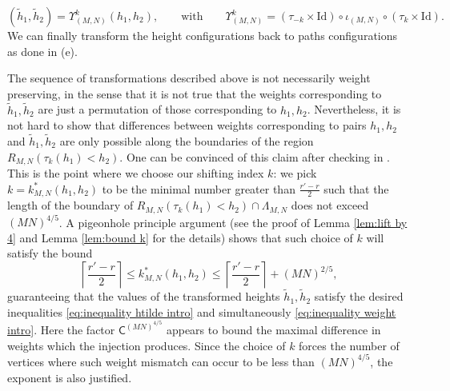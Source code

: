 \documentclass[reqno,11pt]{amsart}
\numberwithin{equation}{section}
\theoremstyle{definition}
\begin{document}
    \begin{equation*}
        (\widetilde{h}_1,\widetilde{h}_2) = \Upsilon_{(M,N)}^{k} (h_1,h_2),
        \qquad \text{with} \qquad \Upsilon_{(M,N)}^{k} = (\tau_{-k}\times \mathrm{Id}) \circ \iota_{(M,N)} \circ (\tau_{k}\times \mathrm{Id}).
    \end{equation*}
    We can finally transform the height configurations back to paths configurations as done in (e).

    The sequence of transformations described above is not necessarily weight preserving, in the sense that it is not true that the weights corresponding to $\widetilde{h}_1,\widetilde{h}_2$ are just a permutation of those corresponding to $h_1,h_2$. Nevertheless, it is not hard to show that differences between  weights corresponding to pairs $h_1,h_2$ and $\widetilde{h}_1,\widetilde{h}_2$ are only possible along the boundaries of the region $R_{M,N}(\tau_k(h_1)<h_2)$. One can be convinced of this claim after checking in . This is the point where we choose our shifting index $k$: we pick $k=k^*_{M,N}(h_1,h_2)$ to be the minimal number greater than $\frac{r'-r}{2}$ such that the length of the boundary of $R_{M,N}(\tau_k(h_1)<h_2) \cap \Lambda_{M,N}$ does not exceed $(MN)^{4/5}$. A pigeonhole principle argument (see the proof of Lemma \ref{lem:lift by 4} and Lemma \ref{lem:bound k} for the details) shows that such choice of $k$ will satisfy the bound
    \begin{equation*} 
        \left\lceil \frac{r'-r}{2} \right\rceil \le k^*_{M,N}(h_1,h_2) \le \left\lceil \frac{r'-r}{2} \right\rceil + (MN)^{2/5},
    \end{equation*}
    guaranteeing that the values of the transformed heights $\widetilde{h}_1,\widetilde{h}_2$ satisfy the desired inequalities \eqref{eq:inequality htilde intro} and simultaneously \eqref{eq:inequality weight intro}. Here the factor $\mathsf{C}^{(MN)^{4/5}}$ appears to bound the maximal difference in  weights which the injection produces. Since the choice of $k$ forces the number of vertices where such  weight mismatch can occur to be less than $(MN)^{4/5}$, the exponent is also justified.
\end{document}
